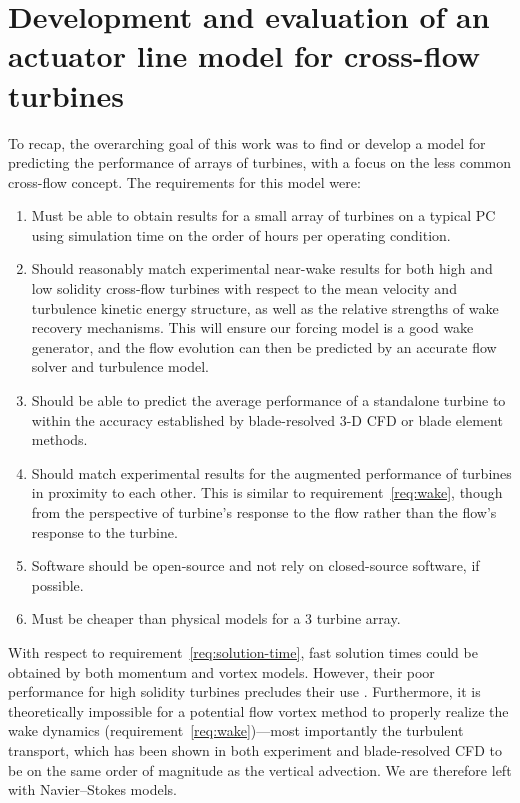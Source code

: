 \chapter{Development and evaluation of an actuator line model for cross-flow
    turbines}\label{chap:ALM}

To recap, the overarching goal of this work was to find or develop a model for
predicting the performance of arrays of turbines, with a focus on the less
common cross-flow concept. The requirements for this model were:

\begin{enumerate}
    \item Must be able to obtain results for a small array of turbines on a
    typical PC using simulation time on the order of hours per operating
    condition.\label{req:solution-time}
    
    \item Should reasonably match experimental near-wake results for both high
    and low solidity cross-flow turbines with respect to the mean velocity and
    turbulence kinetic energy structure, as well as the relative strengths of
    wake recovery mechanisms. This will ensure our forcing model is a good wake
    generator, and the flow evolution can then be predicted by an accurate flow
    solver and turbulence model.\label{req:wake}
    
    \item Should be able to predict the average performance of a standalone
    turbine to within the accuracy established by blade-resolved 3-D CFD or
    blade element methods.
    
    \item Should match experimental results for the augmented performance of
    turbines in proximity to each other. This is similar to
    requirement~\ref{req:wake}, though from the perspective of turbine's
    response to the flow rather than the flow's response to the turbine.
    
    \item Software should be open-source and not rely on closed-source software,
    if possible.
    
    \item Must be cheaper than physical models for a 3 turbine array. 
\end{enumerate}

With respect to requirement~\ref{req:solution-time}, fast solution times could
be obtained by both momentum and vortex models. However, their poor performance
for high solidity turbines precludes their use \cite{Joo2015}. Furthermore, it
is theoretically impossible for a potential flow vortex method to properly
realize the wake dynamics (requirement~\ref{req:wake})---most importantly the
turbulent transport, which has been shown in both experiment and blade-resolved
CFD to be on the same order of magnitude as the vertical advection. We are
therefore left with Navier--Stokes models.

